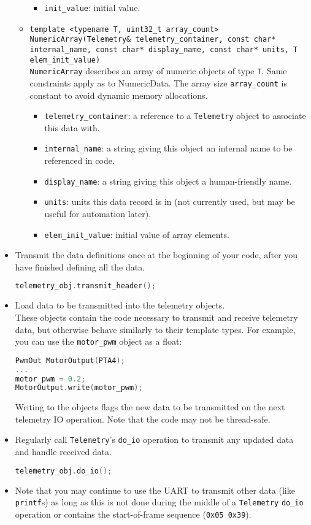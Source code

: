 \documentclass[11pt]{article}
\begin{document}
\begin{itemize}
\begin{itemize}
\begin{itemize}
      \item \texttt{init\_value}: initial value.
    \end{itemize}
    \item \texttt{template <typename T, uint32\_t array\_count>\\ NumericArray(Telemetry\& telemetry\_container, const char* internal\_name, const char* display\_name, const char* units, T elem\_init\_value)} \\
    \texttt{NumericArray} describes an array of numeric objects of type \texttt{T}. Same constraints apply as to NumericData. The array size \texttt{array\_count} is constant to avoid dynamic memory allocations.
    \begin{itemize}
      \item \texttt{telemetry\_container}: a reference to a \texttt{Telemetry} object to associate this data with.
      \item \texttt{internal\_name}: a string giving this object an internal name to be referenced in code.
      \item \texttt{display\_name}: a string giving this object a human-friendly name.
      \item \texttt{units}: units this data record is in (not currently used, but may be useful for automation later).
      \item \texttt{elem\_init\_value}: initial value of array elements.
    \end{itemize}
  \end{itemize}
  \item Transmit the data definitions once at the beginning of your code, after you have finished defining all the data.
  \begin{lstlisting}[language=C++]
telemetry_obj.transmit_header();
  \end{lstlisting}
  \item Load data to be transmitted into the telemetry objects. \\
  These objects contain the code necessary to transmit and receive telemetry data, but otherwise behave similarly to their template types. For example, you can use the \texttt{motor\_pwm} object as a float:
  \begin{lstlisting}[language=C++]
PwmOut MotorOutput(PTA4);
...
motor_pwm = 0.2;
MotorOutput.write(motor_pwm);
  \end{lstlisting}
  Writing to the objects flags the new data to be transmitted on the next telemetry IO operation. Note that the code may not be thread-safe.
  \item Regularly call \texttt{Telemetry}'s \texttt{do\_io} operation to transmit any updated data and handle received data.
  \begin{lstlisting}[language=C++]
telemetry_obj.do_io();
  \end{lstlisting}
  \item Note that you may continue to use the UART to transmit other data (like \texttt{printf}s) as long as this is not done during the middle of a \texttt{Telemetry} \texttt{do\_io} operation or contains the start-of-frame sequence (\texttt{0x05 0x39}).
\end{itemize}
\end{document}
